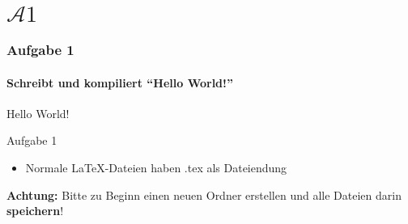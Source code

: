 \section{$\mathcal{A}1$} 
\begin{frame}
\frametitle{Aufgabe 1}
\framesubtitle{Schreibt und kompiliert ``Hello World!''}
\begin{center}
\begin{rm}
\Large Hello World!\\
\end{rm}
\end{center}
\bigskip
\bigskip
\bigskip
\begin{block}{Aufgabe 1}
\begin{itemize}
\item Normale \LaTeX -Dateien haben {\ttfamily .tex} als Dateiendung
\end{itemize}
\end{block}
\begin{alertblock}{\textbf{Achtung:}}
Bitte zu Beginn einen neuen Ordner erstellen und alle Dateien darin \textbf{speichern}!
\end{alertblock}
\end{frame}